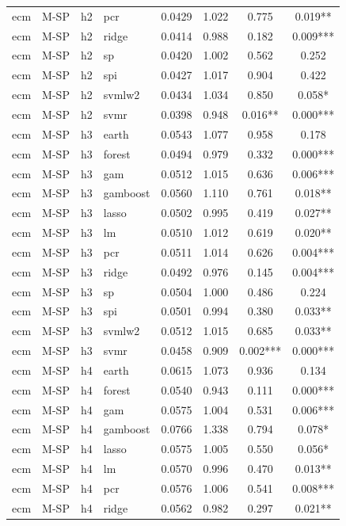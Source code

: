 \begin{ThreePartTable}
\begin{longtable}[t]{llclcccc}
ecm & M-SP & h2 & pcr & 0.0429 & 1.022 & 0.775 & 0.019**\\
ecm & M-SP & h2 & ridge & 0.0414 & 0.988 & 0.182 & 0.009***\\
ecm & M-SP & h2 & sp & 0.0420 & 1.002 & 0.562 & 0.252\\
ecm & M-SP & h2 & spi & 0.0427 & 1.017 & 0.904 & 0.422\\
ecm & M-SP & h2 & svmlw2 & 0.0434 & 1.034 & 0.850 & 0.058*\\
ecm & M-SP & h2 & svmr & 0.0398 & 0.948 & 0.016** & 0.000***\\
\addlinespace
ecm & M-SP & h3 & earth & 0.0543 & 1.077 & 0.958 & 0.178\\
ecm & M-SP & h3 & forest & 0.0494 & 0.979 & 0.332 & 0.000***\\
ecm & M-SP & h3 & gam & 0.0512 & 1.015 & 0.636 & 0.006***\\
ecm & M-SP & h3 & gamboost & 0.0560 & 1.110 & 0.761 & 0.018**\\
ecm & M-SP & h3 & lasso & 0.0502 & 0.995 & 0.419 & 0.027**\\
ecm & M-SP & h3 & lm & 0.0510 & 1.012 & 0.619 & 0.020**\\
ecm & M-SP & h3 & pcr & 0.0511 & 1.014 & 0.626 & 0.004***\\
ecm & M-SP & h3 & ridge & 0.0492 & 0.976 & 0.145 & 0.004***\\
ecm & M-SP & h3 & sp & 0.0504 & 1.000 & 0.486 & 0.224\\
ecm & M-SP & h3 & spi & 0.0501 & 0.994 & 0.380 & 0.033**\\
ecm & M-SP & h3 & svmlw2 & 0.0512 & 1.015 & 0.685 & 0.033**\\
ecm & M-SP & h3 & svmr & 0.0458 & 0.909 & 0.002*** & 0.000***\\
\addlinespace
ecm & M-SP & h4 & earth & 0.0615 & 1.073 & 0.936 & 0.134\\
ecm & M-SP & h4 & forest & 0.0540 & 0.943 & 0.111 & 0.000***\\
ecm & M-SP & h4 & gam & 0.0575 & 1.004 & 0.531 & 0.006***\\
ecm & M-SP & h4 & gamboost & 0.0766 & 1.338 & 0.794 & 0.078*\\
ecm & M-SP & h4 & lasso & 0.0575 & 1.005 & 0.550 & 0.056*\\
ecm & M-SP & h4 & lm & 0.0570 & 0.996 & 0.470 & 0.013**\\
ecm & M-SP & h4 & pcr & 0.0576 & 1.006 & 0.541 & 0.008***\\
ecm & M-SP & h4 & ridge & 0.0562 & 0.982 & 0.297 & 0.021**\\

\end{longtable}
\end{ThreePartTable}
